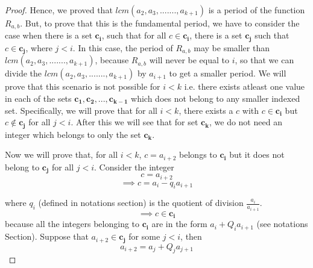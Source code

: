 \documentclass[10pt,a4paper]{amsart}
\begin{document}
\begin{proof}
\par Hence, we proved that $lcm(a_2,a_3,.......,a_{k+1})$ is a period of the function $R_{a,b}$. But, to prove that this is the fundamental period, we have to consider the case when there is a set $\mathbf{c_i}$, such that for all $c \in \mathbf{c_i}$, there is a set $\mathbf{c_j}$ such that $c \in \mathbf{c_j}$, where $j<i$. In this case, the period of $R_{a,b}$ may be smaller than $lcm(a_2,a_3,.......,a_{k+1})$, because $R_{a,b}$ will never be equal to $i$, so that we can divide the $lcm(a_2,a_3,.......,a_{k+1})$ by $a_{i+1}$ to get a smaller period. We will prove that this scenario is not possible for $i<k$ i.e. there exists atleast one value in each of the sets $\mathbf{c_1},\mathbf{c_2},..., \mathbf{c_{k-1}}$ which does not belong to any smaller indexed set. Specifically, we will prove that for all $i<k$, there exists a $c$ with $c \in \mathbf{c_i}$ but $c \notin \mathbf{c_j}$ for all $j<i$. After this we will see that for set $\mathbf{c_k}$, we do not need an integer which belongs to only the set $\mathbf{c_k}$.    
    \par  Now we will prove that, for all $i<k$, $c=a_{i+2}$ belongs to $\mathbf{c_i}$ but it does not belong to $\mathbf{c_j}$ for all $j<i$. Consider the integer $$c=a_{i+2}$$
$$\implies c = a_i-q_ia_{i+1}$$ 

where $q_i$ (defined in notations section) is the quotient of division $\frac{a_i}{a_{i+1}}$.
$$\implies c \in \mathbf{c_i}$$
because all the integers belonging to $\mathbf{c_i}$ are in the form $a_i+Q_ia_{i+1}$ (see notations Section).
Suppose that $a_{i+2} \in \mathbf{c_j}$ for some $j<i$, then 
\begin{equation}  \label{perEq1}
a_{i+2}=a_j+Q_{j}a_{j+1}    
\end{equation}





\end{proof}
\end{document}
